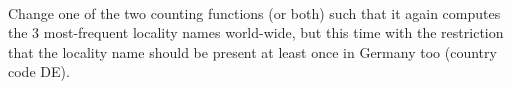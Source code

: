 \\
Change one of the two counting functions (or both) such that it again computes the 3
most-frequent locality names world-wide, but this time with the restriction
that the locality name should be present at least once in Germany too
(country code DE).
